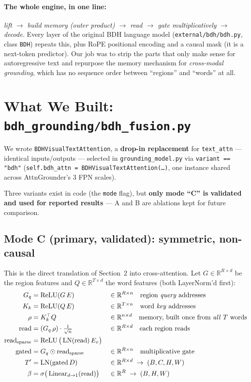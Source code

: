 \documentclass[11pt]{article}
\newcommand{\R}{\mathbb{R}}
\begin{document}
\paragraph{The whole engine, in one line:} \emph{lift $\to$ build memory
(outer product) $\to$ read $\to$ gate multiplicatively $\to$ decode.} Every layer of
the original BDH language model (\texttt{external/bdh/bdh.py}, class \texttt{BDH})
repeats this, plus RoPE positional encoding and a causal mask (it is a next-token
predictor). Our job was to strip the parts that only make sense for autoregressive
text and repurpose the memory mechanism for \emph{cross-modal grounding}, which has
no sequence order between ``regions'' and ``words'' at all.

\section{What We Built: \texttt{bdh\_grounding/bdh\_fusion.py}}

We wrote \texttt{BDHVisualTextAttention}, a \textbf{drop-in replacement} for
\texttt{text\_attn} --- identical inputs/outputs --- selected in
\texttt{grounding\_model.py} via \texttt{variant == "bdh"}
(\texttt{self.bdh\_attn = BDHVisualTextAttention(\ldots)}, one instance shared
across AttnGrounder's 3 FPN scales).

Three variants exist in code (the \texttt{mode} flag), but \textbf{only mode
``C'' is validated and used for reported results} --- A and B are ablations kept
for future comparison.

\subsection{Mode C (primary, validated): symmetric, non-causal}

This is the direct translation of Section~2 into cross-attention. Let
$G \in \R^{R\times d}$ be the region features and $Q \in \R^{T\times d}$ the word
features (both LayerNorm'd first):
\begin{align}
  G_q &= \operatorname{ReLU}(G\,E) && \in \R^{R \times n} \quad \text{region \emph{query} addresses} \\
  K_k &= \operatorname{ReLU}(Q\,E) && \in \R^{T \times n} \quad \text{word \emph{key} addresses} \\
  \rho &= K_k^{\top} Q && \in \R^{n \times d} \quad \text{memory, built once from \emph{all} $T$ words} \\
  \text{read} &= (G_q\,\rho) \cdot \tfrac{1}{\sqrt n} && \in \R^{R \times d} \quad \text{each region reads} \\
  \text{read}_{\text{sparse}} &= \operatorname{ReLU}\big(\operatorname{LN}(\text{read})\,E_v\big) \\
  \text{gated} &= G_q \odot \text{read}_{\text{sparse}} && \in \R^{R \times n} \quad \text{multiplicative gate} \\
  T' &= \operatorname{LN}(\text{gated}\,D) && \in \R^{R \times d} \;\to\; (B,C,H,W) \\
  \beta &= \sigma\big(\operatorname{Linear}_{d\to1}(\text{read})\big) && \in \R^{R} \;\to\; (B,H,W)
\end{align}
\end{document}
